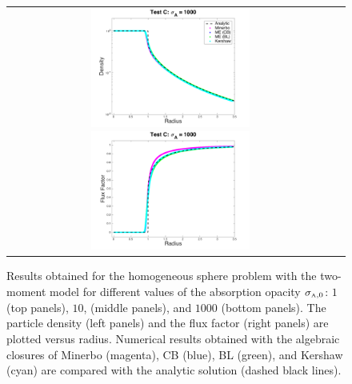 \begin{figure}[h]
\begin{tabular}{cc}
    \includegraphics[width=0.5\textwidth]{figures/HomogeneousSphere_ClosureComparison_Chi_1e3_Density}
    \includegraphics[width=0.5\textwidth]{figures/HomogeneousSphere_ClosureComparison_Chi_1e3_FluxFactor}
  \end{tabular}
   \caption{Results obtained for the homogeneous sphere problem with the two-moment model for different values of the absorption opacity $\sigma_{\mbox{\tiny A},0}$: $1$ (top panels), $10$, (middle panels), and $1000$ (bottom panels).  The particle density (left panels) and the flux factor (right panels) are plotted versus radius.  Numerical results obtained with the algebraic closures of Minerbo (magenta), CB (blue), BL (green), and Kershaw (cyan) are compared with the analytic solution (dashed black lines).}
  \label{fig:HomogeneousSphere}
\end{figure}

